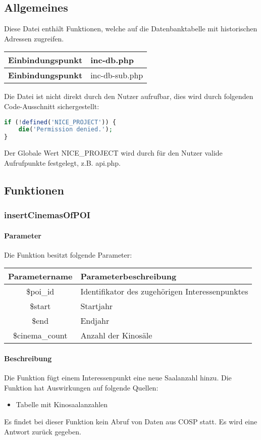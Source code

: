 \subsection{Allgemeines} Diese Datei enthält Funktionen, welche auf die Datenbanktabelle mit historischen Adressen zugreifen.
\begin{table}[H]
	\begin{tabular}{|c|p{11cm}|}
		\hline
		\textbf{Einbindungspunkt} & inc-db.php \\ \hline
		\textbf{Einbindungspunkt} & inc-db-sub.php \\ \hline
	\end{tabular}
\end{table}
Die Datei ist nicht direkt durch den Nutzer aufrufbar, dies wird durch folgenden Code-Ausschnitt sichergestellt:
\begin{lstlisting}[language=php]
if (!defined('NICE_PROJECT')) {
	die('Permission denied.');
}
\end{lstlisting}
Der Globale Wert {\glqq NICE\_PROJECT\grqq} wird durch für den Nutzer valide Aufrufpunkte festgelegt, z.B. {\glqq api.php\grqq}.
\newpage
\subsection{Funktionen}
\subsubsection{insertCinemasOfPOI}
\paragraph{Parameter} Die Funktion besitzt folgende Parameter:
\begin{table}[H]
	\begin{tabular}{|c|p{11cm}|}
		\hline
		\textbf{Parametername} & \textbf{Parameterbeschreibung} \\ \hline
		\$poi\_id       & Identifikator des zugehörigen Interessenpunktes \\ \hline
		\$start         & Startjahr \\ \hline
		\$end           & Endjahr \\ \hline
		\$cinema\_count & Anzahl der Kinosäle \\ \hline
	\end{tabular}
\end{table}
\paragraph{Beschreibung} Die Funktion fügt einem Interessenpunkt eine neue Saalanzahl hinzu. Die Funktion hat Auswirkungen auf folgende Quellen:
\begin{itemize}
	\item Tabelle mit Kinosaalanzahlen
\end{itemize}
Es findet bei dieser Funktion kein Abruf von Daten aus {\glqq COSP\grqq} statt. Es wird eine Antwort zurück gegeben.
